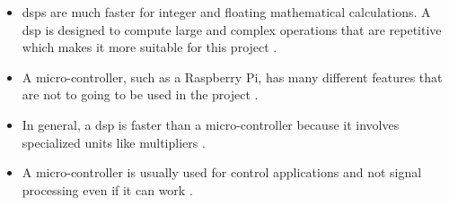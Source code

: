 \begin{itemize}

\item \gls{dsp}s are much faster for integer and floating mathematical calculations. A \gls{dsp} is designed to compute large and complex operations that are repetitive which makes it more suitable for this project \citep{diffbet} \citep{esp_simone}.   

\item A micro-controller, such as a Raspberry Pi, has many different features that are not to going to be used in the project \citep{diffbet} \citep{esp_simone}. 

\item In general, a \gls{dsp} is faster than a micro-controller because it involves specialized units like multipliers \citep{diffbet2}. 

\item A micro-controller is usually used for control applications and not signal processing even if it can work \citep{tex_dsp}.

\end{itemize}











